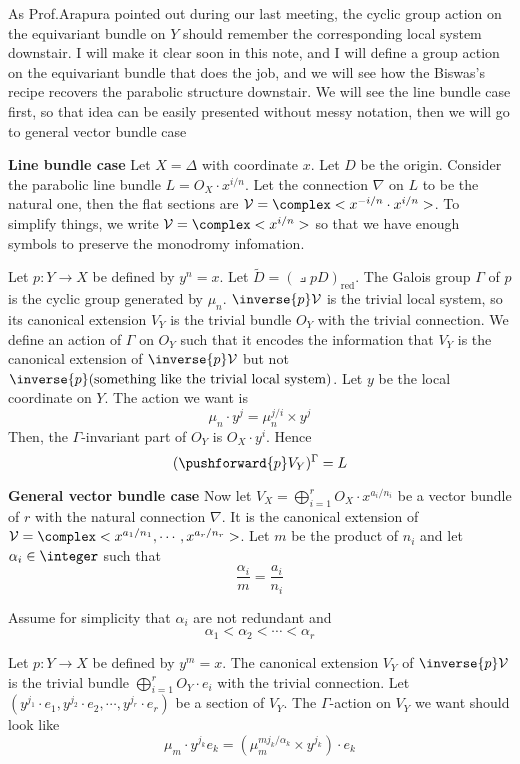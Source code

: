 \documentclass{article}
\begin{document}
\newcommand{\V}{\mathcal{V}}
\newcommand{\invariant}{(\pushforward{p}V_Y)^{\Gamma}}
\newcommand{\invariantt}{(\pushforward{p}V_Y\otimes O_Y(\floor{-m\times t}\tilde{D}))^{\Gamma}}
\newcommand{\tD}{\tilde{D}}
As Prof.Arapura pointed out during our last meeting, the cyclic group action on the equivariant
bundle on $Y$ should remember the corresponding local system downstair. 
I will make it clear soon in this note,
and I will define a group action on the equivariant bundle that does the job, and we will see
how the Biswas's recipe recovers the parabolic structure downstair.
We will see the line bundle case first, so that idea can be easily presented without messy
notation, then we will go to general vector bundle case

\textbf{Line bundle case} Let $X = \Delta$ with coordinate $x$. Let $D$ be the origin.
Consider the parabolic line
bundle $L = O_X\cdot x^{i/n}$. Let the connection $\nabla$ on $L$ to be the natural one, then
the flat sections are $\V = \complex<x^{-i/n}\cdot x^{i/n}>$. To simplify things, we write
$\V = \complex<x^{i/n}>$ so that we have enough symbols to preserve the monodromy infomation. 

Let $p: Y \rightarrow X$ be defined by $y^n = x$. Let $\tD = (\pullback{p}D)_{\text{red}}$.
The Galois group $\Gamma$ of $p$ is the cyclic
group generated by $\mu_n$. $\inverse{p}\V$ is the trivial local system, so its canonical 
extension $V_Y$ is the trivial bundle $O_Y$ with the trivial connection. We define an action of 
$\Gamma$ on $O_Y$ such that it encodes the information that $V_Y$ is the canonical extension
of $\inverse{p}\V$ but not $\inverse{p}(\text{something like the trivial local system})$. 
Let $y$ be the local coordinate
on $Y$. The action we want is
\[
    \mu_n \cdot y^j = \mu_n^{j/i}\times y^j
\]
Then, the $\Gamma$-invariant part of $O_Y$ is $O_X\cdot y^i$. Hence
\[
    (\pushforward{p}V_Y)^{\Gamma} = L
\]


\textbf{General vector bundle case} Now let 
$V_X = \bigoplus\limits_{i=1}^{r} O_X\cdot x^{a_i/n_i}$ be a vector bundle of $r$ with the natural
connection $\nabla$. It is the canonical extension of 
$\V = \complex<x^{a_1/n_1},\cdots, x^{a_r/n_r}>$. Let $m$ be the product of $n_i$ and let 
$\alpha_i \in \integer$ such that
\[
    \frac{\alpha_i}{m} = \frac{a_i}{n_i}
\]

Assume for simplicity that $\alpha_i$ are not redundant and 
\[
    \alpha_1 < \alpha_2 < \cdots < \alpha_r 
\]

Let $p: Y \rightarrow X$ be defined by $y^m = x$. The canonical extension $V_Y$ of
$\inverse{p}\V$ is the trivial bundle $\bigoplus\limits_{i=1}^{r} O_Y\cdot e_i$ with
the trivial connection. Let $(y^{j_1}\cdot e_1, y^{j_2}\cdot e_2,\cdots, y^{j_r}\cdot e_r)$
be a section of $V_Y$. The $\Gamma$-action on $V_Y$ we want should look like
\[
    \mu_m \cdot y^{j_k}e_k = (\mu_m^{mj_k/\alpha_k}\times y^{j_k})\cdot e_k
\]
\end{document}
